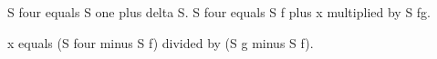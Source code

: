 S four equals S one plus delta S.  
S four equals S f plus x multiplied by S fg.  

x equals (S four minus S f) divided by (S g minus S f).